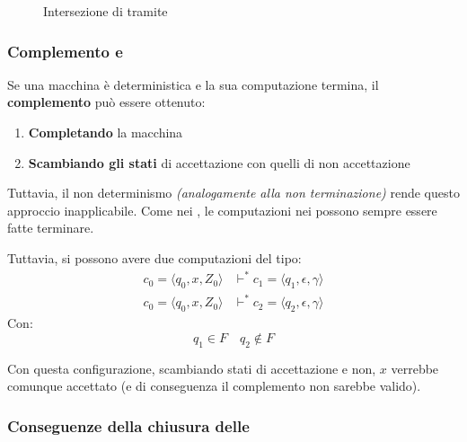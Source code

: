 \documentclass[italian, 10pt]{article}
\begin{document}
\begin{figure}[htbp]
  \bigskip
  \centering

  \caption{Intersezione di \PDA tramite \NPDA}
  \label{fig:intersezione-PDA-tramite-NPDA}
  \bigskip
\end{figure}

\subsubsection{Complemento e \ND}

Se una macchina è deterministica e la sua computazione termina, il \textbf{complemento} può essere ottenuto:
\begin{enumerate}
  \item \textbf{Completando} la macchina
  \item \textbf{Scambiando gli stati} di accettazione con quelli di non accettazione
\end{enumerate}

Tuttavia, il non determinismo \textit{(analogamente alla non terminazione)} rende questo approccio inapplicabile.
Come nei \DPDA, le computazioni nei \NPDA possono sempre essere fatte terminare.

Tuttavia, si possono avere due computazioni del tipo:
\begin{align*}
  c_0 = \langle q_0, x, Z_0 \rangle & \vdash^\ast c_1 = \langle q_1, \epsilon, \gamma \rangle \\
  c_0 = \langle q_0, x, Z_0 \rangle & \vdash^\ast c_2 = \langle q_2, \epsilon, \gamma \rangle
\end{align*}
Con:
\[ q_1 \in F \quad q_2 \notin F \]

Con questa configurazione, scambiando stati di accettazione e non, \(x\) verrebbe comunque accettato (e di conseguenza il complemento non sarebbe valido).

\subsubsection{Conseguenze della chiusura delle \NPDA}
\end{document}
